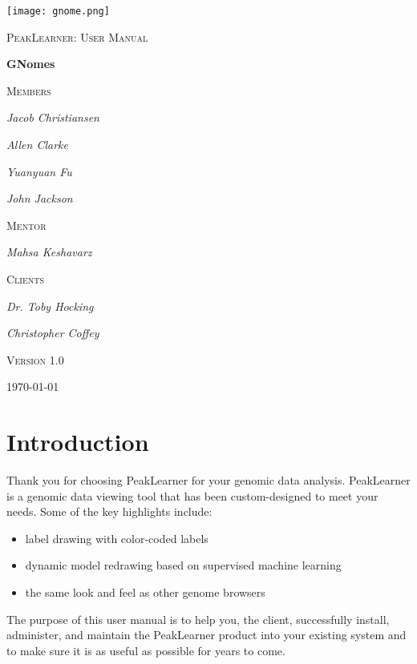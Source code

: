 \documentclass[a4paper,12pt]{article}
\begin{document}
\begin{titlepage}
	\centering
	\texttt{[image: gnome.png]}\par\vspace{1cm}
	{\scshape\LARGE PeakLearner: User Manual \par}
	\vspace{1cm}
	{\huge\bfseries GNomes\par}
	\vspace{1cm}
	{\scshape\Large Members\par}
	{\Large\itshape Jacob Christiansen\par}
	{\Large\itshape Allen Clarke\par}
	{\Large\itshape Yuanyuan Fu\par}
	{\Large\itshape John Jackson\par}
	\vspace{1cm}
	{\scshape\Large Mentor\par}
	{\Large\itshape Mahsa Keshavarz\par}
	\vspace{1cm}
	{\scshape\Large Clients\par}
	{\Large\itshape Dr. Toby Hocking\par}
	{\Large\itshape Christopher Coffey\par}


	\vfill

	{\large\scshape Version 1.0\par}
	{\large \today\par}
\end{titlepage}

\setcounter{tocdepth}{1}
\tableofcontents

\newpage


\section{Introduction}

Thank you for choosing PeakLearner for your genomic data analysis. PeakLearner is a genomic data viewing tool that has been custom-designed to meet your needs. Some of the key highlights include:
	\begin{itemize}
		\item label drawing with color-coded labels
		\item dynamic model redrawing based on supervised machine learning
		\item the same look and feel as other genome browsers
	\end{itemize}
The purpose of this user manual is to help you, the client, successfully
install, administer, and maintain the PeakLearner product into your existing system and to make sure it is as useful as possible for years to come.
\end{document}
